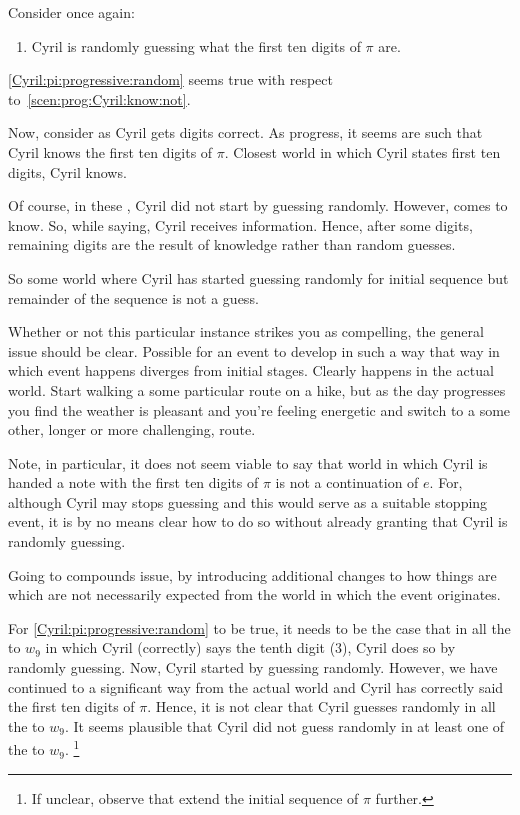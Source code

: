 \begin{note}
  Consider once again:
  \begin{enumerate}[label=\arabic*., ref=(\arabic*), resume*=CyrilProg]
  \item
    \label{Cyril:pi:progressive:random}
    Cyril is randomly guessing what the first ten digits of \(\pi\) are.
  \end{enumerate}
  \ref{Cyril:pi:progressive:random} seems true with respect to~\autoref{scen:prog:Cyril:know:not}.

  Now, consider as Cyril gets digits correct.
  As progress, it seems  are such that Cyril knows the first ten digits of \(\pi\).
  Closest world in which Cyril states first ten digits, Cyril knows.

  Of course, in these , Cyril did not start by guessing randomly.
  However, comes to know.
  So, while saying, Cyril receives information.
  Hence, after some digits, remaining digits are the result of knowledge rather than random guesses.

  So some world where Cyril has started guessing randomly for initial sequence but remainder of the sequence is not a guess.

  Whether or not this particular instance strikes you as compelling, the general issue should be clear.
  Possible for an event to develop in such a way that way in which event happens diverges from initial stages.
  Clearly happens in the actual world.
  Start walking a some particular route on a hike, but as the day progresses you find the weather is pleasant and you're feeling energetic and switch to a some other, longer or more challenging, route.

  Note, in particular, it does not seem viable to say that world in which Cyril is handed a note with the first ten digits of \(\pi\) is not a continuation of \(e\).
  For, although Cyril may stops guessing and this would serve as a suitable stopping event, it is by no means clear how to do so without already granting that Cyril is randomly guessing.

  Going to  compounds issue, by introducing additional changes to how things are which are not necessarily expected from the world in which the event originates.

  For \ref{Cyril:pi:progressive:random} to be true, it needs to be the case that in all the  to \(w_{9}\) in which Cyril (correctly) says the tenth digit (\(3\)), Cyril does so by randomly guessing.
  Now, Cyril started by guessing randomly.
  However, we have continued to  a significant way from the actual world and Cyril has correctly said the first ten digits of \(\pi\).
  Hence, it is not clear that Cyril guesses randomly in all the  to \(w_{9}\).
  It seems plausible that Cyril did not guess randomly in at least one of the  to \(w_{9}\).%
  \footnote{
    If unclear, observe that extend the initial sequence of \(\pi\) further.
  }


\end{note}
